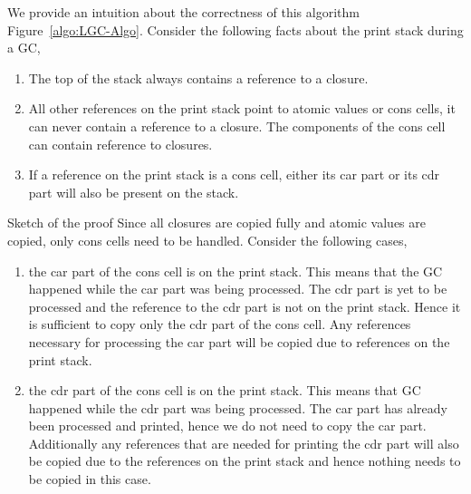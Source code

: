 \documentclass[9pt]{sigplanconf}
\begin{document}
\begin{enumerate}
We   provide   an   intuition    about   the   correctness   of   this
algorithm Figure~\ref{algo:LGC-Algo}. Consider the following facts about the print stack during a
GC, 

\begin{enumerate}
\item The top of the stack always contains a reference to a closure.
\item All other references on the print stack point to atomic values or cons cells, it can never contain a
reference to a closure. The components of the cons cell can contain reference to closures.
\item If a reference on the print stack is a cons cell, either its car part or its cdr part will also be 
present on the stack.
\end{enumerate}
Sketch of the proof
Since all closures are copied fully and atomic values are copied, only cons cells need to be handled. 
Consider the following cases,
\begin{enumerate}
\item the car part of the cons  cell is on the print stack. This means
  that the GC happened while the car part was being processed. The cdr
  part is yet to be processed and the reference to the cdr part is not
  on the print stack. Hence it is sufficient to copy only the cdr part
  of the  cons cell. Any  references necessary for processing  the car
  part will be copied due to references on the print stack.
\item the cdr part of the cons  cell is on the print stack. This means
  that GC  happened while the cdr  part was being  processed.  The car
  part has already been processed and printed, hence we do not need to
  copy the car  part. Additionally any references that  are needed for
  printing the cdr  part will also be copied due  to the references on
  the print stack and hence nothing needs to be copied in this case.

\end{enumerate}
\end{enumerate}
\end{document}
